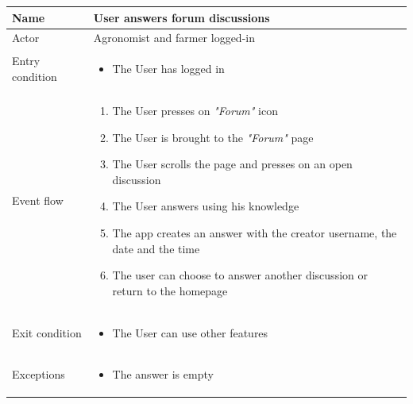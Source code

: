 \begin{table}[H]
    \begin{tabu} to \textwidth {|X|X[4]|}
        \hline
        Name            & User answers forum discussions           \\ \hline
        Actor           & Agronomist and farmer logged-in    \\ \hline
        Entry condition & \begin{itemize}
            \item The User has logged in
        \end{itemize} \\ \hline
        Event flow      & \begin{enumerate}
            \item The User presses on \emph{"Forum"} icon
            \item The User is brought to the \emph{"Forum"} page
            \item The User scrolls the page and presses on an open discussion
            \item The User answers using his knowledge
            \item The app creates an answer with the creator username, the date and the time
            \item The user can choose to answer another discussion or return to the homepage
        \end{enumerate} \\ \hline
        Exit condition  & \begin{itemize}
            \item The User can use other features
        \end{itemize} \\ \hline
        Exceptions      & \begin{itemize}
            \item The answer is empty
        \end{itemize} \\ \hline
    \end{tabu}
\end{table}

